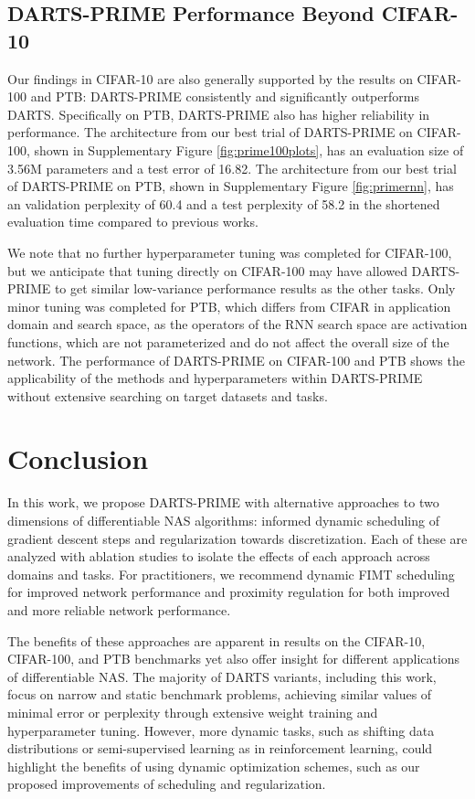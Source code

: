 \documentclass[letterpaper]{article} \usepackage{aaai22}  \usepackage{times}  \usepackage{helvet}  \usepackage{courier}  \usepackage[hyphens]{url}  \usepackage{graphicx} \urlstyle{rm} \def\UrlFont{\rm}  \usepackage{natbib}  \usepackage{caption} \DeclareCaptionStyle{ruled}{labelfont=normalfont,labelsep=colon,strut=off} \frenchspacing  \setlength{\pdfpagewidth}{8.5in}  \setlength{\pdfpageheight}{11in}  \usepackage{algorithm}
\begin{document}
\subsection{DARTS-PRIME Performance Beyond CIFAR-10} 

Our findings in CIFAR-10 are also generally supported by the results on CIFAR-100 and PTB: DARTS-PRIME consistently and significantly outperforms DARTS. Specifically on PTB, DARTS-PRIME also has higher reliability in performance. The architecture from our best trial of DARTS-PRIME on CIFAR-100, shown in Supplementary Figure \ref{fig:prime100plots}, has an evaluation size of 3.56M parameters and a test error of 16.82. The architecture from our best trial of DARTS-PRIME on PTB, shown in Supplementary Figure \ref{fig:primernn}, has an validation perplexity of 60.4 and a test perplexity of 58.2 in the shortened evaluation time compared to previous works. 

We note that no further hyperparameter tuning was completed for CIFAR-100, but we anticipate that tuning directly on CIFAR-100 may have allowed DARTS-PRIME to get similar low-variance performance results as the other tasks. Only minor tuning was completed for PTB, which differs from CIFAR in application domain and search space, as the operators of the RNN search space are activation functions, which are not parameterized and do not affect the overall size of the network. The performance of DARTS-PRIME on CIFAR-100 and PTB shows the applicability of the methods and hyperparameters within DARTS-PRIME without extensive searching on target datasets and tasks. 

\section{Conclusion}

In this work, we propose DARTS-PRIME with alternative approaches to two dimensions of differentiable NAS algorithms: informed dynamic scheduling of gradient descent steps and regularization towards discretization. Each of these are analyzed with ablation studies to isolate the effects of each approach across domains and tasks. For practitioners, we recommend dynamic FIMT scheduling for improved network performance and proximity regulation for both improved and more reliable network performance. 

The benefits of these approaches are apparent in results on the CIFAR-10, CIFAR-100, and PTB benchmarks yet also offer insight for different applications of differentiable NAS. The majority of DARTS variants, including this work, focus on narrow and static benchmark problems, achieving similar values of minimal error or perplexity through extensive weight training and hyperparameter tuning. However, more dynamic tasks, such as shifting data distributions or semi-supervised learning as in reinforcement learning, could highlight the benefits of using dynamic optimization schemes, such as our proposed improvements of scheduling and regularization.   
\end{document}
